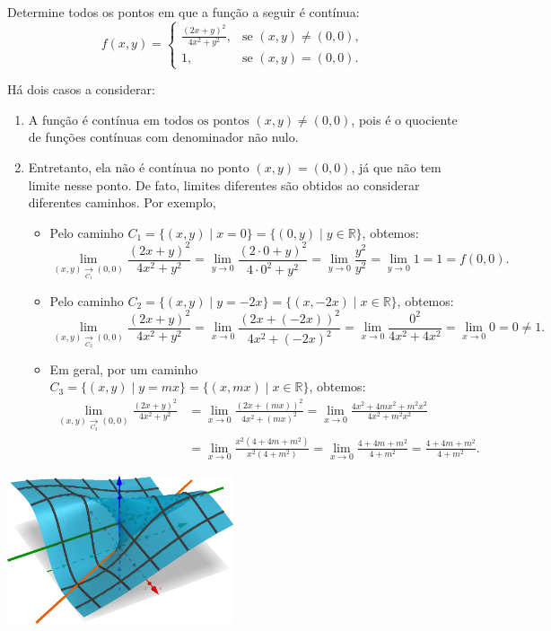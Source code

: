 \documentclass[12pt,a4paper]{article}
\begin{document}
\begin{ExerciseList}
\Exercise[title={2,5}] Determine todos os pontos em que a função a seguir é contínua:
\[
f(x, y) = 
\begin{cases}
    \frac{(2x + y)^2}{4x^2 + y^2}, & \text{se } (x, y) \neq (0, 0), \\
    1, & \text{se } (x, y) = (0, 0).
\end{cases}
\]

\Answer Há dois casos a considerar:
\begin{enumerate}
\item A função \(\boxed{\text{é contínua em todos os pontos } (x, y) \neq (0, 0)}\), pois é o quociente de funções contínuas com denominador não nulo. 
\item Entretanto, ela \(\boxed{\text{não é contínua no ponto } (x, y) = (0, 0)}\), já que não tem limite nesse ponto. De fato, limites diferentes são obtidos ao considerar diferentes caminhos. Por exemplo,
\begin{itemize}
\item Pelo caminho $C_1 = \{(x, y)\mid x = 0 \} = \{(0, y)\mid y \in \mathbb{R} \}$, obtemos:
\[
\lim_{(x, y) \xrightarrow[C_1]{} (0, 0)} \frac{(2x + y)^2}{4x^2 + y^2}
  = \lim_{y\to 0} \frac{(2\cdot 0 + y)^2}{4\cdot 0^2 + y^2}
  = \lim_{y\to 0} \frac{y^2}{y^2}
  = \lim_{y\to 0} 1
  = 1 = f(0, 0).
\]
\item Pelo caminho $C_2 = \{(x, y)\mid y = -2x \} = \{(x, -2x)\mid x \in \mathbb{R} \}$, obtemos:
\[
\lim_{(x, y) \xrightarrow[C_2]{} (0, 0)} \frac{(2x + y)^2}{4x^2 + y^2}
  = \lim_{x\to 0} \frac{(2x + (-2x))^2}{4x^2 + (-2x)^2}
  = \lim_{x\to 0} \frac{0^2}{4x^2+4x^2}
  = \lim_{x\to 0} 0
  = 0 \neq 1.
\]
\item Em geral, por um caminho $C_3 = \{(x, y)\mid y = mx \} = \{(x, mx)\mid x \in \mathbb{R} \}$, obtemos:
\begin{align*}
\lim_{(x, y) \xrightarrow[C_3]{} (0, 0)} \frac{(2x + y)^2}{4x^2 + y^2}
& = \lim_{x\to 0} \frac{(2x + (mx))^2}{4x^2 + (mx)^2}
  = \lim_{x\to 0} \frac{4x^2 + 4mx^2 + m^2x^2}{4x^2 + m^2x^2} \\
& = \lim_{x\to 0} \frac{x^2(4 + 4m + m^2)}{x^2(4 + m^2)}
  = \lim_{x\to 0} \frac{4 + 4m + m^2}{4 + m^2}
  = \frac{4 + 4m + m^2}{4 + m^2}.
\end{align*}
\end{itemize}
\end{enumerate}

\begin{center}
\includegraphics[width=0.5\textwidth]{img/continuidade.png}
\end{center}



\end{ExerciseList}
\end{document}
